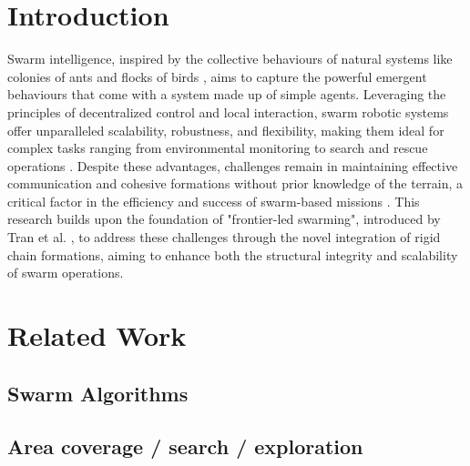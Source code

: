 \documentclass[runningheads]{llncs}
\begin{document}
\section{Introduction}
Swarm intelligence, inspired by the collective behaviours of natural systems like colonies of ants and flocks of birds \cite{garnier2007}, aims to capture the powerful emergent behaviours that come with a system made up of simple agents\cite{mataric1995}.
Leveraging the principles of decentralized control and local interaction, swarm robotic systems offer unparalleled scalability, robustness, and flexibility, making them ideal for complex tasks ranging from environmental monitoring to search and rescue operations \cite{hamann2018,ijspeert2001}. 
Despite these advantages, challenges remain in maintaining effective communication and cohesive formations without prior knowledge of the terrain, a critical factor in the efficiency and success of swarm-based missions \cite{xu2014}. 
This research builds upon the foundation of "frontier-led swarming", introduced by Tran et al. \cite{tran2022}, to address these challenges through the novel integration of rigid chain formations, aiming to enhance both the structural integrity and scalability of swarm operations.




\section{Related Work}
\subsection{Swarm Algorithms}

\subsection{Area coverage / search / exploration}
\end{document}
